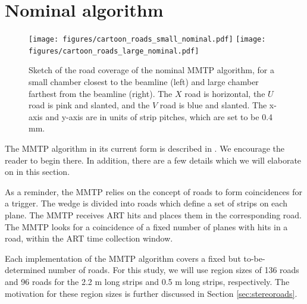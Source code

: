 \section{Nominal algorithm}
\label{sec:nominal}
\begin{figure}[!htpb]
  \begin{center}
    \texttt{[image: figures/cartoon\_roads\_small\_nominal.pdf]}
    \texttt{[image: figures/cartoon\_roads\_large\_nominal.pdf]}
  \end{center}
  \vspace{-10pt}
  \caption{Sketch of the road coverage of the nominal MMTP algorithm, for a small chamber closest to the beamline (left) and large chamber farthest from the beamline (right). The $X$ road is horizontal, the $U$ road is pink and slanted, and the $V$ road is blue and slanted. The x-axis and y-axis are in units of strip pitches, which are set to be 0.4 mm.}
  \label{fig:cartoon_nominal}
\end{figure}
The MMTP algorithm in its current form is described in \cite{mmtp}. We encourage the reader to begin there. In addition, there are a few details which we will elaborate on in this section.
\par As a reminder, the MMTP relies on the concept of roads to form coincidences for a trigger. The wedge is divided into roads which define a set of strips on each plane. The MMTP receives ART hits and places them in the corresponding road. The MMTP looks for a coincidence of a fixed number of planes with hits in a road, within the ART time collection window.
\par Each implementation of the MMTP algorithm covers  a fixed but to-be-determined number of roads. For this study, we will use region sizes of 136 roads and 96 roads for the 2.2 m long strips and 0.5 m long strips, respectively. The motivation for these region sizes is further discussed in Section \ref{sec:stereoroads}. 
